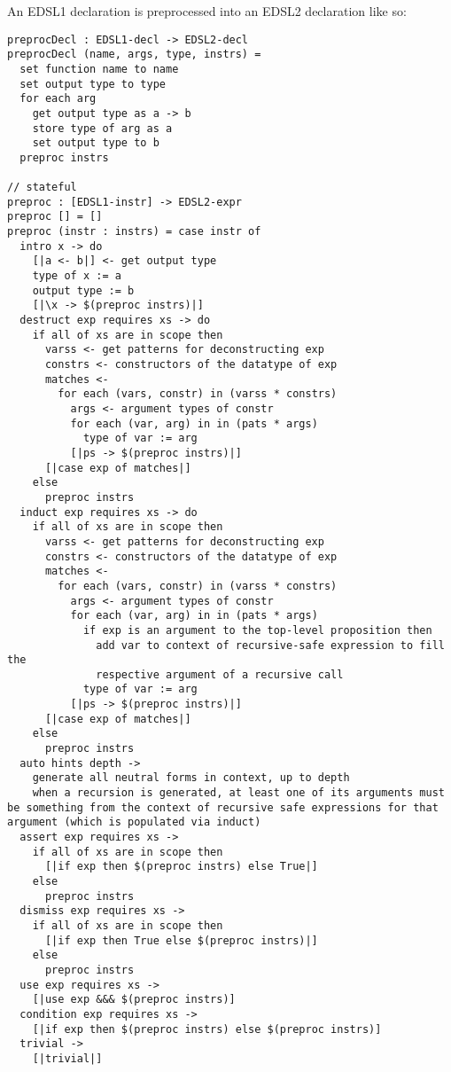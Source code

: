 An EDSL1 declaration is preprocessed into an EDSL2 declaration like so:

\begin{verbatim}
preprocDecl : EDSL1-decl -> EDSL2-decl
preprocDecl (name, args, type, instrs) =
  set function name to name
  set output type to type
  for each arg
    get output type as a -> b 
    store type of arg as a
    set output type to b
  preproc instrs

// stateful
preproc : [EDSL1-instr] -> EDSL2-expr
preproc [] = []
preproc (instr : instrs) = case instr of 
  intro x -> do
    [|a <- b|] <- get output type
    type of x := a
    output type := b
    [|\x -> $(preproc instrs)|]
  destruct exp requires xs -> do
    if all of xs are in scope then 
      varss <- get patterns for deconstructing exp
      constrs <- constructors of the datatype of exp
      matches <- 
        for each (vars, constr) in (varss * constrs)
          args <- argument types of constr
          for each (var, arg) in in (pats * args)
            type of var := arg
          [|ps -> $(preproc instrs)|]
      [|case exp of matches|]
    else
      preproc instrs
  induct exp requires xs -> do
    if all of xs are in scope then 
      varss <- get patterns for deconstructing exp
      constrs <- constructors of the datatype of exp
      matches <-
        for each (vars, constr) in (varss * constrs)
          args <- argument types of constr
          for each (var, arg) in in (pats * args)
            if exp is an argument to the top-level proposition then
              add var to context of recursive-safe expression to fill the
              respective argument of a recursive call
            type of var := arg
          [|ps -> $(preproc instrs)|]
      [|case exp of matches|]
    else
      preproc instrs
  auto hints depth ->
    generate all neutral forms in context, up to depth
    when a recursion is generated, at least one of its arguments must be something from the context of recursive safe expressions for that argument (which is populated via induct)
  assert exp requires xs ->
    if all of xs are in scope then
      [|if exp then $(preproc instrs) else True|]
    else
      preproc instrs
  dismiss exp requires xs ->
    if all of xs are in scope then
      [|if exp then True else $(preproc instrs)|]
    else
      preproc instrs
  use exp requires xs -> 
    [|use exp &&& $(preproc instrs)]
  condition exp requires xs ->
    [|if exp then $(preproc instrs) else $(preproc instrs)]
  trivial ->
    [|trivial|]


\end{verbatim}

